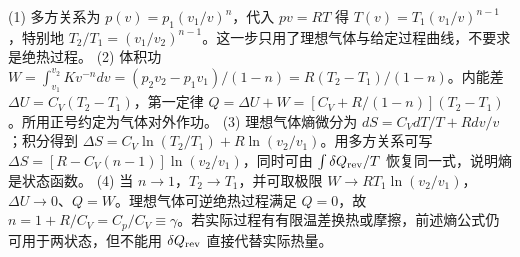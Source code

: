 (1) 多方关系为 \(p(v)=p_1(v_1/v)^n\)，代入 \(pv=RT\) 得 \(T(v)=T_1(v_1/v)^{n-1}\)，特别地 \(T_2/T_1=(v_1/v_2)^{n-1}\)。这一步只用了理想气体与给定过程曲线，不要求是绝热过程。
(2) 体积功 \(W=\int_{v_1}^{v_2}K v^{-n}dv=(p_2v_2-p_1v_1)/(1-n)=R(T_2-T_1)/(1-n)\)。内能差 \(\Delta U=C_V(T_2-T_1)\)，第一定律 \(Q=\Delta U+W=[C_V+R/(1-n)](T_2-T_1)\)。所用正号约定为气体对外作功。
(3) 理想气体熵微分为 \(dS=C_VdT/T+Rdv/v\)；积分得到 \(\Delta S=C_V\ln(T_2/T_1)+R\ln(v_2/v_1)\)。用多方关系可写 \(\Delta S=[R-C_V(n-1)]\ln(v_2/v_1)\)，同时可由 \(\int\delta Q_{\rm rev}/T\) 恢复同一式，说明熵是状态函数。
(4) 当 \(n\to1\)，\(T_2\to T_1\)，并可取极限 \(W\to RT_1\ln(v_2/v_1)\)，\(\Delta U\to0\)、\(Q=W\)。理想气体可逆绝热过程满足 \(Q=0\)，故 \(n=1+R/C_V=C_p/C_V\equiv\gamma\)。若实际过程有有限温差换热或摩擦，前述熵公式仍可用于两状态，但不能用 \(\delta Q_{\rm rev}\) 直接代替实际热量。
